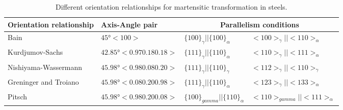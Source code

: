 
\begin{table*}
\begin{tabular}{ l l l l }
\hline\hline
    Orientation relationship & Axis-Angle pair & \multicolumn{2}{c}{Parallelism conditions} \\
    \hline
    Bain \cite{bain1924nature} &
    $45°<100>$ &
    $\{100\}_{\gamma}||\{100\}_{\alpha}$ & $<100>_{\gamma}||<110>_{\alpha}$ \\
    
    Kurdjumov-Sachs \cite{kurdjumow1930mechanismus} &
    $42.85°<0.97 0.18 0.18>$ &
    $\{111\}_{\gamma}||\{110\}_{\alpha}$ &
    $<110>_{\gamma}||<111>_{\alpha}$ \\
    
    Nishiyama-Wassermann \cite{nishiyama1934x,wassermann1935ueber} &
    $45.98° <0.98 0.08 0.20>$ &
    $\{111\}_{\gamma}||\{110\}_{\gamma}$ &
    $<112>_{\gamma}||<110>_{\gamma}$ \\
    
    Greninger and Troiano \cite{greninger1949mechanism} &
    $45.98° <0.08 0.20 0.98>$ &
    $\{111\}_{\gamma} || \{110\}_{\alpha}$ &
    $<123>_{\gamma} || <133>_{\alpha}$ \\
    
    Pitsch \cite{pitsch1962orientierungszusammenhang} &
    $45.98° <0.98 0.20 0.08>$ &
    $\{100\}_{gamma} || \{110\}_{\alpha}$ &
    $<110>_{gamma} || <111>_{\alpha}$ \\
\hline
\end{tabular}
\caption{\label{table_ORs}Different orientation relationships for martensitic transformation in steels.}
\end{table*}
